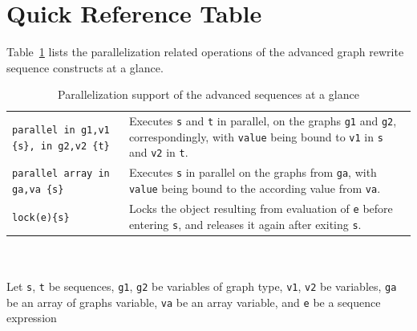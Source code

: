 \pagebreak

\section{Quick Reference Table}

Table~\ref{seqparalleltab} lists the parallelization related operations of the advanced graph rewrite sequence constructs at a glance.

\begin{table}[htbp]
\begin{minipage}{\linewidth} \renewcommand{\footnoterule}{} 
\begin{tabularx}{\linewidth}{|lX|}
\hline
\texttt{parallel in g1,v1 \{s\}, in g2,v2 \{t\}} & Executes \texttt{s} and \texttt{t} in parallel, on the graphs \texttt{g1} and \texttt{g2}, correspondingly, with \texttt{value} being bound to \texttt{v1} in \texttt{s} and \texttt{v2} in \texttt{t}.\\
\texttt{parallel array in ga,va \{s\}} & Executes \texttt{s} in parallel on the graphs from \texttt{ga}, with \texttt{value} being bound to the according value from \texttt{va}.\\
\hline
\texttt{lock(e)\{s\}} & Locks the object resulting from evaluation of \texttt{e} before entering \texttt{s}, and releases it again after exiting \texttt{s}.\\
\hline
\end{tabularx}
\end{minipage}\\
\\ 
{\small Let \texttt{s}, \texttt{t} be sequences, \texttt{g1}, \texttt{g2} be variables of graph type, \texttt{v1}, \texttt{v2} be variables, \texttt{ga} be an array of graphs variable, \texttt{va} be an array variable, and \texttt{e} be a sequence expression}
\caption{Parallelization support of the advanced sequences at a glance}
\label{seqparalleltab}
\end{table}
 
